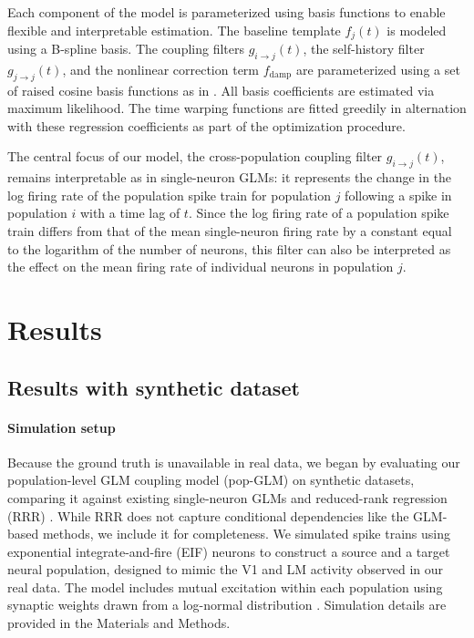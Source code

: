 \documentclass[12pt]{article}
\begin{document}
Each component of the model is parameterized using basis functions to enable flexible and interpretable estimation. The baseline template $f_j(t)$ is modeled using a B-spline basis. The coupling filters $g_{i \rightarrow j}(t)$, the self-history filter $g_{j \rightarrow j}(t)$, and the nonlinear correction term $f_{\text{damp}}$ are parameterized using a set of raised cosine basis functions as in \citet{pillow2008spatio}. All basis coefficients are estimated via maximum likelihood. The time warping functions are fitted greedily in alternation with these regression coefficients as part of the optimization procedure.

The central focus of our model, the cross-population coupling filter \( g_{i \rightarrow j}(t) \), remains interpretable as in single-neuron GLMs: it represents the change in the log firing rate of the population spike train for population \( j \) following a spike in population \( i \) with a time lag of \( t \). Since the log firing rate of a population spike train differs from that of the mean single-neuron firing rate by a constant equal to the logarithm of the number of neurons, this filter can also be interpreted as the effect on the mean firing rate of individual neurons in population \( j \).

\section{Results}

\subsection{Results with synthetic dataset}
\label{sec:Results with synthetic dataset}

\paragraph{Simulation setup} 
Because the ground truth is unavailable in real data, we began by evaluating our population-level GLM coupling model (pop-GLM) on synthetic datasets, comparing it against existing single-neuron GLMs \citep{yates2017functional, hart2020recurrent} and reduced-rank regression (RRR) \citep{semedo2019cortical}. While RRR does not capture conditional dependencies like the GLM-based methods, we include it for completeness. We simulated spike trains using exponential integrate-and-fire (EIF) neurons \citep{gerstner2014neuronal, huang2019circuit, fourcaud2003spike} to construct a source and a target neural population, designed to mimic the V1 and LM activity observed in our real data. The model includes mutual excitation within each population using synaptic weights drawn from a log-normal distribution \citep{song2005highly}. Simulation details are provided in the Materials and Methods.
\end{document}

